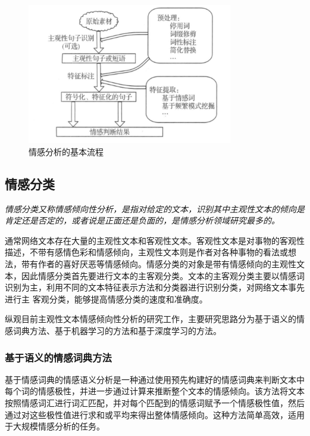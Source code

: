 \documentclass[hyperref,a4paper,UTF8]{ctexart}
\begin{document}
\begin{figure}[ht]
	\centering
	\includegraphics[width=0.8\textwidth]{fig/pic2.png}
	\caption{情感分析的基本流程}
    \label{fig:example}
\end{figure}


\subsection{情感分类}
\textit{情感分类又称情感倾向性分析，是指对给定的文本，识别其中主观性文本的倾向是肯定还是否定的，或者说是正面还是负面的，是情感分析领域研究最多的。} \cite{DBLP:journals/ijon/MerchaB23}



通常网络文本存在大量的主观性文本和客观性文本。客观性文本是对事物的客观性描述，不带有感情色彩和情感倾向，主观性文本则是作者对各种事物的看法或想法，带有作者的喜好厌恶等情感倾向。情感分类的对象是带有情感倾向的主观性文本，因此情感分类首先要进行文本的主客观分类。文本的主客观分类主要以情感词识别为主，利用不同的文本特征表示方法和分类器进行识别分类，对网络文本事先进行主 客观分类，能够提高情感分类的速度和准确度。


纵观目前主观性文本情感倾向性分析的研究工作，主要研究思路分为基于语义的情感词典方法、基于机器学习的方法和基于深度学习的方法。
\subsubsection{基于语义的情感词典方法}

基于情感词典的情感语义分析是一种通过使用预先构建好的情感词典来判断文本中每个词的情感极性，并进一步通过计算来推断整个文本的情感倾向。该方法将文本按照情感词汇进行词汇匹配，并对每个匹配到的情感词赋予一个情感极性值，然后通过对这些极性值进行求和或平均来得出整体情感倾向。这种方法简单高效，适用于大规模情感分析的任务。\cite{DBLP:journals/widm/ZhangWL18}
\end{document}

